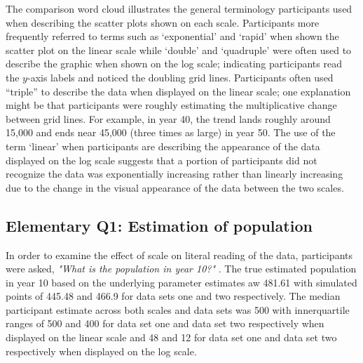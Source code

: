 \documentclass[print]{nuthesis}
\begin{document}
The comparison word cloud illustrates the general terminology participants used when describing the scatter plots shown on each scale.
Participants more frequently referred to terms such as `exponential' and `rapid' when shown the scatter plot on the linear scale while `double' and `quadruple' were often used to describe the graphic when shown on the log scale; indicating participants read the \(y\)-axis labels and noticed the doubling grid lines.
Participants often used ``triple'' to describe the data when displayed on the linear scale; one explanation might be that participants were roughly estimating the multiplicative change between grid lines.
For example, in year 40, the trend lands roughly around 15,000 and ends near 45,000 (three times as large) in year 50.
The use of the term `linear' when participants are describing the appearance of the data displayed on the log scale suggests that a portion of participants did not recognize the data was exponentially increasing rather than linearly increasing due to the change in the visual appearance of the data between the two scales. 

\hypertarget{elementary-q1-estimation-of-population}{%
\subsection{Elementary Q1: Estimation of population}\label{elementary-q1-estimation-of-population}}

In order to examine the effect of scale on literal reading of the data, participants were asked, \textit{"What is the population in year 10?"} .
The true estimated population in year 10 based on the underlying parameter estimates aw 481.61 with simulated points of 445.48 and 466.9 for data sets one and two respectively.
The median participant estimate across both scales and data sets was 500 with innerquartile ranges of 500 and 400 for data set one and data set two respectively when displayed on the linear scale and 48 and 12 for data set one and data set two respectively when displayed on the log scale.
\end{document}
